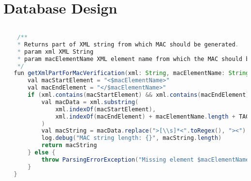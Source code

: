 \documentclass{article}
\begin{document}
\section{Database Design}


\begin{lstlisting}[language=Java, caption=Format XML for MAC calculation example]
        
    /**
    * Returns part of XML string from which MAC should be generated.
    * param xml XML String
    * param macElementName XML element name from which the MAC should be generated
    */
   fun getXmlPartForMacVerification(xml: String, macElementName: String): String {
       val macStartElement = "<$macElementName>"
       val macEndElement = "</$macElementName>"
       if (xml.contains(macStartElement) && xml.contains(macEndElement)) {
           val macData = xml.substring(
               xml.indexOf(macStartElement),
               xml.indexOf(macEndElement) + macElementName.length + TAG_OFFSET
           )
           val macString = macData.replace(">[\\s]*<".toRegex(), "><")
           log.debug("MAC string length: {}", macString.length)
           return macString
       } else {
           throw ParsingErrorException("Missing element $macElementName for MAC.")
       }
   }
\end{lstlisting}
\end{document}
